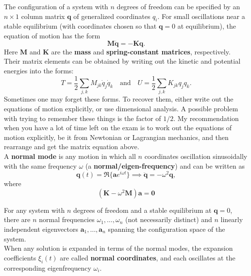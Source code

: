 \documentclass{book}
\theoremstyle{definition}
\newcommand{\f}[2]{\frac{#1}{#2}}
\newcommand{\lp}{\left(}
\newcommand{\rp}{\right)}
\begin{document}
The configuration of a system with $n$ degrees of freedom can be specified by an $n\times 1$ column matrix $\mathbf{q}$ of generalized coordinates $q_i$. For small oscillations near a stable equilibrium (with coordinates chosen so that $\mathbf{q} = 0$ at equilibrium), the equation of motion has the form 
\begin{equation}
\mathbf{M} \ddot{\mathbf{q}} = -\mathbf{K} \mathbf{q}. 
\end{equation}
Here $\mathbf{M}$ and $\mathbf{K}$ are the \textbf{mass} and \textbf{spring-constant matrices}, respectively. Their matrix elements can be obtained by writing out the kinetic and potential energies into the forms:
\begin{equation*}
T = \f{1}{2}\sum_{j,k} M_{jk} \dot{q}_j \dot{q}_k \quad \text{and} \quad U = \f{1}{2}\sum_{j,k} K_{jk}q_jq_k.
\end{equation*} 
Sometimes one may forget these forms. To recover them, either write out the equations of motion explicitly, or use dimensional analysis. A possible problem with trying to remember these things is the factor of $1/2$. My recommendation when you have a lot of time left on the exam is to work out the equations of motion explicitly, be it from Newtonian or Lagrangian mechanics, and then rearrange and get the matrix equation above. \\


A \textbf{normal mode} is any motion in which all $n$ coordinates oscillation sinusoidally with the same frequency $\omega$ (a \textbf{normal/eigen-frequency}) and can be written as 
\begin{equation*}
\mathbf{q}(t) = \Re\{ \mathbf{a} e^{i\omega t} \} \implies \ddot{\mathbf{q}} = -\omega^2 \mathbf{q},
\end{equation*}
where 
\begin{equation*}
\lp \mathbf{K} - \omega^2 \mathbf{M} \rp \mathbf{a} = \mathbf{0}
\end{equation*}


For any system with $n$ degrees of freedom and a stable equilibrium at $\mathbf{q} = 0$, there are $n$ normal frequencies $\omega_1,\dots, \omega_n$ (not necessarily distinct) and $n$ linearly independent eigenvectors $\mathbf{a}_1,\dots, \mathbf{a}_n$ spanning the configuration space of the system. \\


When any solution is expanded in terms of the normal modes, the expansion coefficients $\xi_i(t)$ are called \textbf{normal coordinates}, and each oscillates at the corresponding eigenfrequency $\omega_i$.
\end{document}
